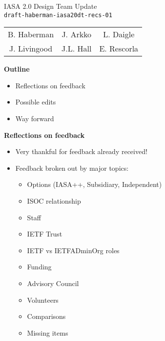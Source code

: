 \documentclass[helvetica]{seminar}
\newcommand{\heading}[1]{%
  \begin{center} 
    \large\bf 
    #1 
  \end{center} 
  \vspace{.4 in}}
\begin{document}
\begin{slide}
\begin{center}
\vspace{.5 in}
\LARGE{{\bf}IASA 2.0 Design Team Update\\{\small \verb^draft-haberman-iasa20dt-recs-01^}}\\
\vspace{.2in}
\large{
\begin{tabular}{ c c c }
B. Haberman & J. Arkko & L. Daigle \\
J. Livingood & J.L. Hall & E. Rescorla 
\end{tabular}
}
\end{center}
\end{slide}

\centerslidesfalse 

\begin{slide}
\heading{Outline}

\begin{itemize}
\item Reflections on feedback
\item Possible edits
\item Way forward
\end{itemize}

\end{slide}


\begin{slide}

\heading{Reflections on feedback}

{\footnotesize
\begin{itemize}
\item Very thankful for feedback already received!
\item Feedback broken out by major topics:
\begin{itemize}
\item Options (IASA++, Subsidiary, Independent)
\item ISOC relationship
\item Staff
\item IETF Trust
\item IETF vs IETFADminOrg roles
\item Funding
\item Advisory Council
\item Volunteers
\item Comparisons
\item Missing items
\end{itemize}
\end{itemize}
}
\end{slide}
\end{document}
